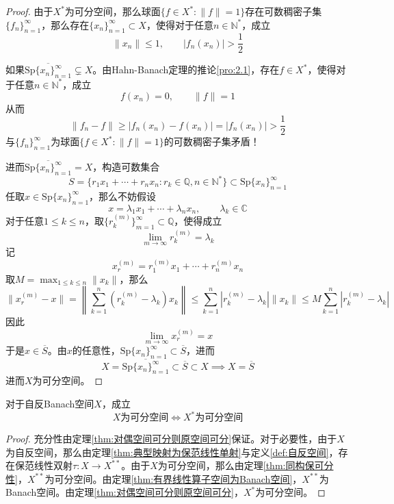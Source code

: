 \documentclass[lang = cn, scheme = chinese, thmcnt = section]{elegantbook}
\newcommand{\N}{\mathbb{N}}            %
\newcommand{\C}{\mathbb{C}}  		   %
\newcommand{\Q}{\mathbb{Q}}            %
\newcommand{\sub}{\subset}             %
\begin{document}
\begin{proof}
	由于$X^*$为可分空间，那么球面$\{f\in X^*:\|f\|=1\}$存在可数稠密子集$\{f_n\}_{n=1}^{\infty}$，那么存在$\{x_n\}_{n=1}^{\infty}\sub X$，使得对于任意$n\in\N^*$，成立
	$$
	\|x_n\|\le 1,\qquad 
	|f_n(x_n)|>\frac{1}{2}
	$$
	
	如果$\overline{\text{Sp}\{x_n\}_{n=1}^{\infty}}\subsetneq X$。由Hahn-Banach定理的推论\ref{pro:2.1}，存在$f\in X^*$，使得对于任意$n\in\N^*$，成立
	$$
	f(x_n)=0,\qquad \|f\|=1
	$$
	从而
	$$
	\|f_n-f\|\ge |f_n(x_n)-f(x_n)|=|f_n(x_n)|>\frac{1}{2}
	$$
	与$\{f_n\}_{n=1}^{\infty}$为球面$\{f\in X^*:\|f\|=1\}$的可数稠密子集矛盾！
	
	进而$\overline{\text{Sp}\{x_n\}_{n=1}^{\infty}}=X$，构造可数集合
	$$
	S=\{ r_1x_1+\cdots+r_nx_n:r_k\in \Q,n\in\N^* \}\sub \text{Sp}\{x_n\}_{n=1}^{\infty}
	$$
	任取$x\in \text{Sp}\{x_n\}_{n=1}^{\infty}$，那么不妨假设
	$$
	x=\lambda_1x_1+\cdots+\lambda_nx_n,\qquad \lambda_k\in\C
	$$
	对于任意$1\le k \le n$，取$\{ r_k^{(m)} \}_{m=1}^{\infty}\sub \Q$，使得成立
	$$
	\lim_{m\to\infty}r_k^{(m)}=\lambda_k
	$$
	记
	$$
	x_r^{(m)}=r_1^{(m)}x_1+\cdots +r_n^{(m)}x_n
	$$
	取$\displaystyle M=\max_{1\le k\le n}\|x_k\|$，那么
	$$
	\|x_r^{(m)}-x\|
	=\left\| \sum_{k=1}^{n}(r_k^{(m)}-\lambda_k)x_k \right\|
	\le \sum_{k=1}^{n}|r_k^{(m)}-\lambda_k|\|x_k\|
	\le M\sum_{k=1}^{n}|r_k^{(m)}-\lambda_k|
	$$
	因此
	$$
	\lim_{m\to\infty}x_r^{(m)}=x
	$$
	于是$x\in \overline{S}$。由$x$的任意性，$\text{Sp}\{x_n\}_{n=1}^{\infty}\sub\overline{S}$，进而
	$$
	X=\overline{\text{Sp}\{x_n\}_{n=1}^{\infty}}\sub \overline{S}\sub X\implies X=\overline{S}
	$$
	进而$X$为可分空间。
\end{proof}

\begin{theorem}
	对于自反Banach空间$X$，成立
	$$
	X\text{为可分空间}\iff X^*\text{为可分空间}
	$$
\end{theorem}

\begin{proof}
	充分性由定理\ref{thm:对偶空间可分则原空间可分}保证。对于必要性，由于$X$为自反空间，那么由定理\ref{thm:典型映射为保范线性单射}与定义\ref{def:自反空间}，存在保范线性双射$\tau:X\to X^{**}$。由于$X$为可分空间，那么由定理\ref{thm:同构保可分性}，$X^{**}$为可分空间。由定理\ref{thm:有界线性算子空间为Banach空间}，$X^{**}$为Banach空间。由定理\ref{thm:对偶空间可分则原空间可分}，$X^*$为可分空间。
\end{proof}
\end{document}
